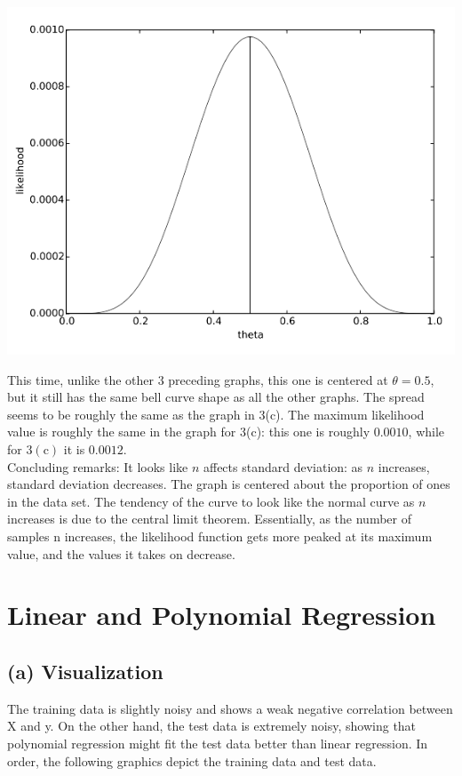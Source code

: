 \documentclass[11pt]{article}
\newcommand{\sol}[1]{{\bf{\color{magenta}{{Solution:}}}}}
\begin{document}
\begin{center}
    \includegraphics[scale=0.4]{3d-3.png} \\
\end{center}

This time, unlike the other 3 preceding graphs, this one is centered at $\theta=0.5$, but it still has the same bell curve shape as all the other graphs. The spread seems to be roughly the same as the graph in 3(c). The maximum likelihood value is roughly the same in the graph for 3(c): this one is roughly $0.0010$, while for $3(\mathrm{c})$ it is $0.0012$. \\

Concluding remarks: It looks like $n$ affects standard deviation: as $n$ increases, standard deviation decreases. The graph is centered about the proportion of ones in the data set. The tendency of the curve to look like the normal curve as $n$ increases is due to the central limit theorem. Essentially, as the number of samples n increases, the likelihood function gets more peaked at its maximum value, and the values it takes on decrease.

\section{Linear and Polynomial Regression}

\subsection{(a) Visualization}
\sol x The training data is slightly noisy and shows a weak negative correlation between X and y. On the other hand, the test data is extremely noisy, showing that polynomial regression might fit the test data better than linear regression. In order, the following graphics depict the training data and test data.
\end{document}
